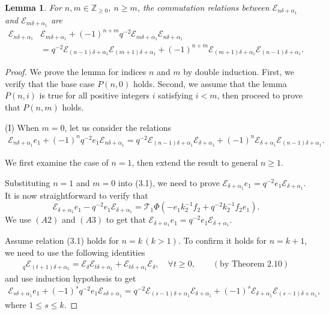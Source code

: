 \documentclass[12pt]{amsart}
\newtheorem{lemma}[theorem]{Lemma}
\numberwithin{equation}{section}
\numberwithin{equation}{section}
\begin{document}
\begin{lemma}
For \(n,m\in\mathbb{Z}_{\ge 0}\), \(n\ge m\), the commutation relations between \(\mathcal{E}_{n\delta+\alpha_{1}}\) and \(\mathcal{E}_{m\delta+\alpha_{1}}\) are 
\begin{align*}     
\mathcal{E}_{n\delta+\alpha_{1}}&\mathcal{E}_{m\delta+\alpha_{1}}+(-1)^{n+m}q^{-2}\mathcal{E}_{m\delta+\alpha_{1}}\mathcal{E}_{n\delta+\alpha_{1}}\\ &=q^{-2}\mathcal{E}_{(n-1)\delta+\alpha_{1}}\mathcal{E}_{(m+1)\delta+\alpha_{1}}+(-1)^{n+m}\mathcal{E}_{(m+1)\delta+\alpha_{1}}\mathcal{E}_{(n-1)\delta+\alpha_{1}}.  
\end{align*}  
\end{lemma} 
\begin{proof}
We prove the lemma for indices \( n \) and \( m \) by double induction. First, we verify that the base case \( P(n,0) \) holds. Second, we assume that the lemma \( P(n,i) \) is true for all positive integers \( i \)  satisfying \( i<m \), then proceed to prove that \( P(n,m) \) holds.

(I) When \(m = 0\), let us consider the relations 
\begin{align}
\mathcal{E}_{n\delta+\alpha_1} e_1 + (-1)^n q^{-2} e_1 \mathcal{E}_{n\delta+\alpha_1} = q^{-2} \mathcal{E}_{(n-1)\delta+\alpha_1} \mathcal{E}_{\delta+\alpha_1} + (-1)^n \mathcal{E}_{\delta+\alpha_1} \mathcal{E}_{(n-1)\delta+\alpha_1}. 
\end{align}

We first examine the case of \(n=1\), then extend the result to general \(n \geq 1\).
 
Substituting \(n = 1\) and \(m = 0\) into (3.1), we need to prove 
\(
\mathcal{E}_{\delta+\alpha_1} e_1 =q^{-2} e_1 \mathcal{E}_{\delta+\alpha_1}.
\) It is now straightforward to verify that 
\[
\mathcal{E}_{\delta+\alpha_1} e_1 - q^{-2} e_1 \mathcal{E}_{\delta+\alpha_1}=\mathcal{T}_1\Phi\left(-e_1k^{-1}_2f_2 + q^{-2}k^{-1}_2f_2e_1\right).
\]    
We use \((A2)\) and \((A3)\) to get that
\(
\mathcal{E}_{\delta+\alpha_1} e_1 =q^{-2} e_1 \mathcal{E}_{\delta+\alpha_1}\).
 
Assume relation (3.1) holds for \(n = k\,(k>1)\). To confirm it holds for \(n = k+1\), we need to use the following identities
\begin{align}
[2]_q\mathcal{E}_{(t+1)\delta+\alpha_{1}} = \mathcal{E}_{\delta}\mathcal{E}_{t\delta+\alpha_{1}} + \mathcal{E}_{t\delta+\alpha_{1}}\mathcal{E}_{\delta},\quad \forall t\ge 0,\qquad (\text{by Theorem 2.10})
\end{align}
and use induction hypothesis to get
\begin{align}
\mathcal{E}_{s\delta+\alpha_1} e_1 + (-1)^s q^{-2} e_1 \mathcal{E}_{s\delta+\alpha_1} = q^{-2} \mathcal{E}_{(s-1)\delta+\alpha_1} \mathcal{E}_{\delta+\alpha_1} + (-1)^s \mathcal{E}_{\delta+\alpha_1} \mathcal{E}_{(s-1)\delta+\alpha_1},
\end{align}
where \(1\le s\le k\).


\end{proof}
\end{document}
